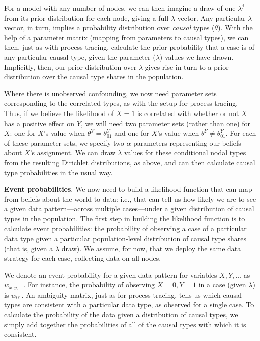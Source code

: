 \documentclass[
  12pt,
]{book}
\begin{document}
For a model with any number of nodes, we can then imagine a draw of one \(\lambda^j\) from its prior distribution for each node, giving a full \(\lambda\) vector. Any particular \(\lambda\) vector, in turn, implies a probability distribution over \emph{causal} types (\(\theta\)). With the help of a parameter matrix (mapping from parameters to causal types), we can then, just as with process tracing, calculate the prior probability that a case is of any particular causal type, given the parameter (\(\lambda\)) values we have drawn. Implicitly, then, our prior distribution over \(\lambda\) gives rise in turn to a prior distribution over the causal type shares in the population.

Where there is unobserved confounding, we now need parameter sets corresponding to the correlated types, as with the setup for process tracing. Thus, if we believe the likelihood of \(X=1\) is correlated with whether or not \(X\) has a positive effect on \(Y\), we will need two parameter sets (rather than one) for \(X\): one for \(X\)'s value when \(\theta^Y = \theta^Y_{01}\) and one for \(X\)'s value when \(\theta^Y \neq \theta^Y_{01}\). For each of these parameter sets, we specify two \(\alpha\) parameters representing our beliefs about \(X\)'s assignment. We can draw \(\lambda\) values for these conditional nodal types from the resulting Dirichlet distributions, as above, and can then calculate causal type probabilities in the usual way.

\textbf{Event probabilities}. We now need to build a likelihood function that can map from beliefs about the world to data: i.e., that can tell us how likely we are to see a given data pattern---across multiple cases---under a given distribution of causal types in the population. The first step in building the likelihood function is to calculate event probabilities: the probability of observing a case of a particular data type given a particular population-level distribution of causal type shares (that is, given a \(\lambda\) draw). We assume, for now, that we deploy the same data strategy for each case, collecting data on all nodes.

We denote an event probability for a given data pattern for variables \(X, Y, \dots\) as \(w_{x, y, \dots}\). For instance, the probability of observing \(X=0, Y=1\) in a case (given \(\lambda\)) is \(w_{01}\). An ambiguity matrix, just as for process tracing, tells us which causal types are consistent with a particular data type, as observed for a single case. To calculate the probability of the data given a distribution of causal types, we simply add together the probabilities of all of the causal types with which it is consistent.
\end{document}
